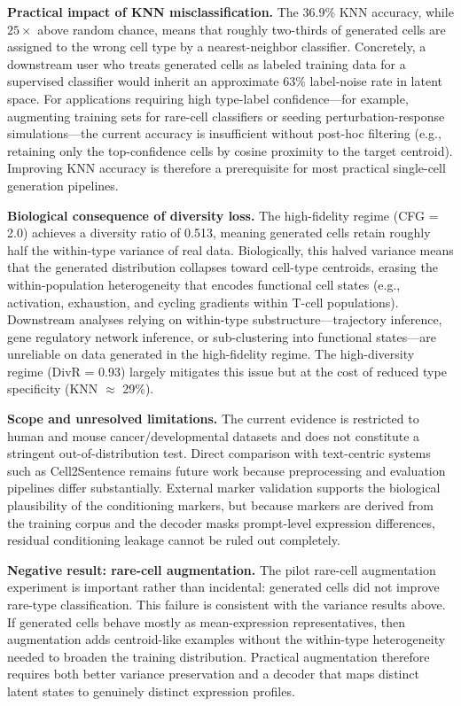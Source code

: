 \documentclass[biology,article,submit,pdftex,moreauthors]{Definitions/mdpi}
\begin{document}
\textbf{Practical impact of KNN misclassification.} The 36.9\% KNN accuracy, while $25\times$ above random chance, means that roughly two-thirds of generated cells are assigned to the wrong cell type by a nearest-neighbor classifier. Concretely, a downstream user who treats generated cells as labeled training data for a supervised classifier would inherit an approximate 63\% label-noise rate in latent space. For applications requiring high type-label confidence---for example, augmenting training sets for rare-cell classifiers or seeding perturbation-response simulations---the current accuracy is insufficient without post-hoc filtering (e.g., retaining only the top-confidence cells by cosine proximity to the target centroid). Improving KNN accuracy is therefore a prerequisite for most practical single-cell generation pipelines.

\textbf{Biological consequence of diversity loss.} The high-fidelity regime (CFG = 2.0) achieves a diversity ratio of 0.513, meaning generated cells retain roughly half the within-type variance of real data. Biologically, this halved variance means that the generated distribution collapses toward cell-type centroids, erasing the within-population heterogeneity that encodes functional cell states (e.g., activation, exhaustion, and cycling gradients within T-cell populations). Downstream analyses relying on within-type substructure---trajectory inference, gene regulatory network inference, or sub-clustering into functional states---are unreliable on data generated in the high-fidelity regime. The high-diversity regime (DivR = 0.93) largely mitigates this issue but at the cost of reduced type specificity (KNN $\approx$ 29\%).

\textbf{Scope and unresolved limitations.}\label{sec:limitations} The current evidence is restricted to human and mouse cancer/developmental datasets and does not constitute a stringent out-of-distribution test. Direct comparison with text-centric systems such as Cell2Sentence remains future work because preprocessing and evaluation pipelines differ substantially. External marker validation supports the biological plausibility of the conditioning markers, but because markers are derived from the training corpus and the decoder masks prompt-level expression differences, residual conditioning leakage cannot be ruled out completely.

\textbf{Negative result: rare-cell augmentation.} The pilot rare-cell augmentation experiment is important rather than incidental: generated cells did not improve rare-type classification. This failure is consistent with the variance results above. If generated cells behave mostly as mean-expression representatives, then augmentation adds centroid-like examples without the within-type heterogeneity needed to broaden the training distribution. Practical augmentation therefore requires both better variance preservation and a decoder that maps distinct latent states to genuinely distinct expression profiles.
\end{document}
